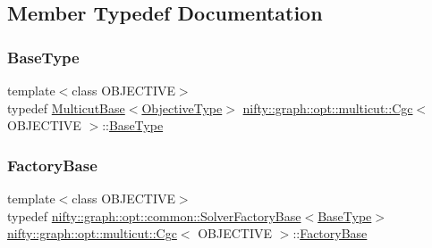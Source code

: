\subsection{Member Typedef Documentation}
\mbox{\label{classnifty_1_1graph_1_1opt_1_1multicut_1_1Cgc_ad2d9dfafea18de663be6d8d606208eec}} 
\subsubsection{\texorpdfstring{Base\+Type}{BaseType}}
{\footnotesize\ttfamily template$<$class O\+B\+J\+E\+C\+T\+I\+VE$>$ \\
typedef \hyperlink{classnifty_1_1graph_1_1opt_1_1multicut_1_1MulticutBase}{Multicut\+Base}$<$\hyperlink{classnifty_1_1graph_1_1opt_1_1multicut_1_1Cgc_aa83ae7cd167c0580c61f1d4eab63eb9a}{Objective\+Type}$>$ \hyperlink{classnifty_1_1graph_1_1opt_1_1multicut_1_1Cgc}{nifty\+::graph\+::opt\+::multicut\+::\+Cgc}$<$ O\+B\+J\+E\+C\+T\+I\+VE $>$\+::\hyperlink{classnifty_1_1graph_1_1opt_1_1multicut_1_1Cgc_ad2d9dfafea18de663be6d8d606208eec}{Base\+Type}}

\mbox{\label{classnifty_1_1graph_1_1opt_1_1multicut_1_1Cgc_a2ce012f31f0652bc12958f2547579020}} 
\subsubsection{\texorpdfstring{Factory\+Base}{FactoryBase}}
{\footnotesize\ttfamily template$<$class O\+B\+J\+E\+C\+T\+I\+VE$>$ \\
typedef \hyperlink{classnifty_1_1graph_1_1opt_1_1common_1_1SolverFactoryBase}{nifty\+::graph\+::opt\+::common\+::\+Solver\+Factory\+Base}$<$\hyperlink{classnifty_1_1graph_1_1opt_1_1multicut_1_1Cgc_ad2d9dfafea18de663be6d8d606208eec}{Base\+Type}$>$ \hyperlink{classnifty_1_1graph_1_1opt_1_1multicut_1_1Cgc}{nifty\+::graph\+::opt\+::multicut\+::\+Cgc}$<$ O\+B\+J\+E\+C\+T\+I\+VE $>$\+::\hyperlink{classnifty_1_1graph_1_1opt_1_1multicut_1_1Cgc_a2ce012f31f0652bc12958f2547579020}{Factory\+Base}}

